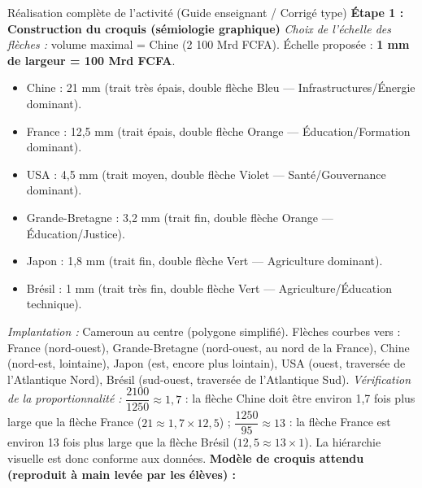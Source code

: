 \documentclass[11pt]{article}
\newcounter{popsec}
\newcounter{popsub}
\newcommand{\courssub}[1]{%
  \stepcounter{popsub}%
  \par\vspace{9pt}\noindent{\popxbold\fontsize{11.5}{13}\selectfont\color{popink}{\color{poporange}\thepopsec.\thepopsub}\hspace{6pt}#1}\par\nopagebreak\vspace{4pt}
}
\begin{document}
\courssub{Démarche et corrigé commenté}
\begin{exoresolu}{Réalisation complète de l'activité (Guide enseignant / Corrigé type)}
\noindent \textbf{Étape 1 : Construction du croquis (sémiologie graphique)}
\medskip
\noindent \textit{Choix de l'échelle des flèches :} volume maximal = Chine (2 100 Mrd FCFA). Échelle proposée : \textbf{1 mm de largeur = 100 Mrd FCFA}.
\begin{itemize}
    \item Chine : 21 mm (trait très épais, double flèche \textcolor{popblue}{Bleu} — Infrastructures/Énergie dominant).
    \item France : 12,5 mm (trait épais, double flèche \textcolor{poporange}{Orange} — Éducation/Formation dominant).
    \item USA : 4,5 mm (trait moyen, double flèche \textcolor{poppurple}{Violet} — Santé/Gouvernance dominant).
    \item Grande-Bretagne : 3,2 mm (trait fin, double flèche \textcolor{poporange}{Orange} — Éducation/Justice).
    \item Japon : 1,8 mm (trait fin, double flèche \textcolor{popgreen}{Vert} — Agriculture dominant).
    \item Brésil : 1 mm (trait très fin, double flèche \textcolor{popgreen}{Vert} — Agriculture/Éducation technique).
\end{itemize}
\noindent \textit{Implantation :} Cameroun au centre (polygone simplifié). Flèches courbes vers : France (nord-ouest), Grande-Bretagne (nord-ouest, au nord de la France), Chine (nord-est, lointaine), Japon (est, encore plus lointain), USA (ouest, traversée de l'Atlantique Nord), Brésil (sud-ouest, traversée de l'Atlantique Sud).
\medskip
\noindent \textit{Vérification de la proportionnalité :} $\dfrac{2100}{1250} \approx 1{,}7$ : la flèche Chine doit être environ 1,7 fois plus large que la flèche France ($21 \approx 1{,}7 \times 12{,}5$) ; $\dfrac{1250}{95} \approx 13$ : la flèche France est environ 13 fois plus large que la flèche Brésil ($12{,}5 \approx 13 \times 1$). La hiérarchie visuelle est donc conforme aux données.
\tcblower
\noindent \textbf{Modèle de croquis attendu (reproduit à main levée par les élèves) :}
\begin{popfigure}
\end{popfigure}
\end{exoresolu}
\end{document}
